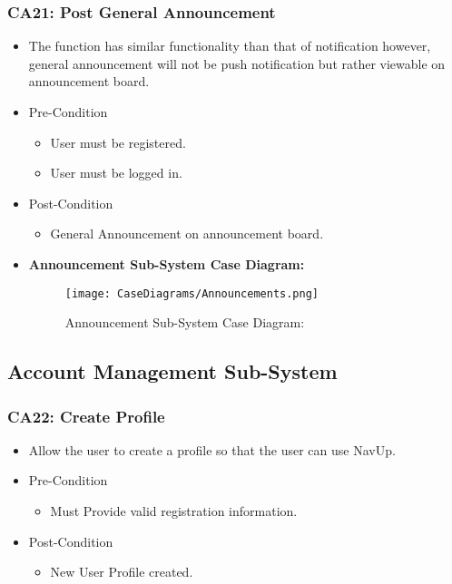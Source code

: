 \documentclass[12pt,a4paper]{article}
\begin{document}
		\subsubsection{CA21: Post General Announcement}
			\begin{itemize}
				\item The function has similar functionality than that of notification however, general announcement will not be push notification but rather viewable on announcement board.
					\item Pre-Condition
						\begin{itemize}
							\item User must be registered.
							\item User must be logged in.
						\end{itemize}
					\item Post-Condition
						\begin{itemize}
							\item General Announcement on announcement board.
						\end{itemize}
				\item \textbf{Announcement Sub-System Case Diagram:}
				\begin{figure}[H]
					\texttt{[image: CaseDiagrams/Announcements.png]}
					\caption{Announcement Sub-System Case Diagram:}
				\end{figure}
			\end{itemize}
	\subsection{Account Management Sub-System}
		\subsubsection{CA22: Create Profile}
			\begin{itemize}
				\item Allow the user to create a profile so that the user can use NavUp.
					\item Pre-Condition
						\begin{itemize}
							\item Must Provide valid registration information.
						\end{itemize}
					\item Post-Condition
						\begin{itemize}
							\item New User Profile created.
						\end{itemize}
			\end{itemize}
\end{document}
